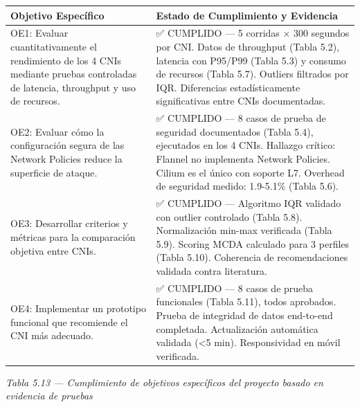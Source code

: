 \documentclass[journal]{IEEEtran}
\begin{document}
\begin{table}[htbp]
\centering
\scriptsize
\begin{tabularx}{\textwidth}{|Y|Y|}
\hline
\textbf{Objetivo Específico} & \textbf{Estado de Cumplimiento y Evidencia} \\
\hline
OE1: Evaluar cuantitativamente el rendimiento de los 4 CNIs mediante pruebas controladas de latencia, throughput y uso de recursos. & ✅ CUMPLIDO --- 5 corridas × 300 segundos por CNI. Datos de throughput (Tabla 5.2), latencia con P95/P99 (Tabla 5.3) y consumo de recursos (Tabla 5.7). Outliers filtrados por IQR. Diferencias estadísticamente significativas entre CNIs documentadas. \\
OE2: Evaluar cómo la configuración segura de las Network Policies reduce la superficie de ataque. & ✅ CUMPLIDO --- 8 casos de prueba de seguridad documentados (Tabla 5.4), ejecutados en los 4 CNIs. Hallazgo crítico: Flannel no implementa Network Policies. Cilium es el único con soporte L7. Overhead de seguridad medido: 1.9-5.1\% (Tabla 5.6). \\
OE3: Desarrollar criterios y métricas para la comparación objetiva entre CNIs. & ✅ CUMPLIDO --- Algoritmo IQR validado con outlier controlado (Tabla 5.8). Normalización min-max verificada (Tabla 5.9). Scoring MCDA calculado para 3 perfiles (Tabla 5.10). Coherencia de recomendaciones validada contra literatura. \\
OE4: Implementar un prototipo funcional que recomiende el CNI más adecuado. & ✅ CUMPLIDO --- 8 casos de prueba funcionales (Tabla 5.11), todos aprobados. Prueba de integridad de datos end-to-end completada. Actualización automática validada (<5 min). Responsividad en móvil verificada. \\
\hline
\end{tabularx}
\end{table}

\begin{center}\emph{\emph{Tabla 5.13 --- Cumplimiento de objetivos específicos del proyecto basado en evidencia de pruebas}}\end{center}
\end{document}
